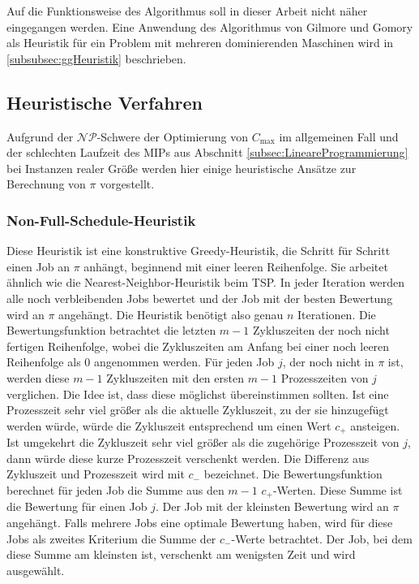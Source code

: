 \documentclass{scrreprt}
\begin{document}
Auf die Funktionsweise des Algorithmus soll in dieser Arbeit nicht näher eingegangen werden.
Eine Anwendung des Algorithmus von Gilmore und Gomory als Heuristik für ein Problem mit mehreren dominierenden Maschinen wird in
\ref{subsubsec:ggHeuristik} beschrieben.


\subsection{Heuristische Verfahren}
\label{subsec:HeuristischeVerfahren}
Aufgrund der $\mathcal{NP}$-Schwere der Optimierung von $C_{\max}$ im allgemeinen Fall und der schlechten Laufzeit des MIPs aus Abschnitt \ref{subsec:LineareProgrammierung}
bei Instanzen realer Größe werden hier einige heuristische Ansätze zur Berechnung von $\pi$ vorgestellt.

\subsubsection{Non-Full-Schedule-Heuristik}
\label{subsubsec:NonFullScheduleHeuristik}
Diese Heuristik ist eine konstruktive Greedy-Heuristik, die Schritt für Schritt einen Job an $\pi$ anhängt, beginnend mit einer leeren Reihenfolge.
Sie arbeitet ähnlich wie die Nearest-Neighbor-Heuristik beim TSP.
In jeder Iteration werden alle noch verbleibenden Jobs bewertet und der Job mit der besten Bewertung wird an $\pi$ angehängt.
Die Heuristik benötigt also genau $n$ Iterationen.
Die Bewertungsfunktion betrachtet die letzten $m-1$ Zykluszeiten der noch nicht fertigen Reihenfolge, 
wobei die Zykluszeiten am Anfang bei einer noch leeren Reihenfolge als $0$ angenommen werden.
Für jeden Job $j$, der noch nicht in $\pi$ ist, werden diese $m-1$ Zykluszeiten mit den ersten $m-1$ Prozesszeiten von $j$ verglichen.
Die Idee ist, dass diese möglichst übereinstimmen sollten. Ist eine Prozesszeit sehr viel größer als die aktuelle Zykluszeit,
zu der sie hinzugefügt werden würde, würde die Zykluszeit entsprechend um einen Wert $c_+$ ansteigen.
Ist umgekehrt die Zykluszeit sehr viel größer als die zugehörige Prozesszeit von $j$, dann würde diese kurze Prozesszeit verschenkt werden.
Die Differenz aus Zykluszeit und Prozesszeit wird mit $c_-$ bezeichnet.
Die Bewertungsfunktion berechnet für jeden Job die Summe aus den $m-1$ $c_+$-Werten.
Diese Summe ist die Bewertung für einen Job $j$. Der Job mit der kleinsten Bewertung wird an $\pi$ angehängt.
Falls mehrere Jobs eine optimale Bewertung haben, wird für diese Jobs als zweites Kriterium die Summe der $c_-$-Werte betrachtet.
Der Job, bei dem diese Summe am kleinsten ist, verschenkt am wenigsten Zeit und wird ausgewählt.
\end{document}
